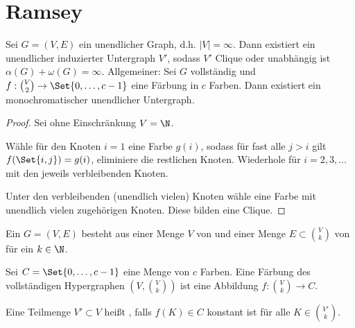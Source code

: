 \chapter{Ramsey}



\begin{st}
    Sei $G = (V,E)$ ein unendlicher Graph, d.h. $|V| = \infty$.
    Dann existiert ein unendlicher induzierter Untergraph $V'$, sodass $V'$ Clique oder unabhängig ist
    \begin{math}
        \alpha(G) + \omega(G) = \infty.
    \end{math}
    Allgemeiner:
    Sei $G$ vollständig und $f: \binom{V}{2} \to \Set{0, \dotsc, c - 1}$ eine Färbung in $c$ Farben.
    Dann existiert ein monochromatischer unendlicher Untergraph.
    \begin{proof}
        Sei ohne Einschränkung $V = \N$.

        Wähle für den Knoten $i = 1$ eine Farbe $g(i)$, sodass für fast alle $j > i$ gilt $f(\Set{i,j}) = g(i)$, eliminiere die restlichen Knoten.
        Wiederhole für $i = 2, 3, \dotsc$ mit den jeweils verbleibenden Knoten.

        Unter den verbleibenden (unendlich vielen) Knoten wähle eine Farbe mit unendlich vielen zugehörigen Knoten.
        Diese bilden eine Clique.
    \end{proof}
\end{st}

\begin{df}
    Ein  $G = (V, E)$ besteht aus einer Menge $V$ von  und einer Menge $E \subset \binom{V}{k}$ von  für ein $k \in \N$.

    Sei $C = \Set{0, \dotsc, c-1}$ eine Menge von $c$ Farben.
    Eine Färbung des vollständigen Hypergraphen $(V, \binom{V}{k})$ ist eine Abbildung $f: \binom{V}{k} \to C$.

    Eine Teilmenge $V' \subset V$ heißt , falls $f(K) \in C$ konstant ist für alle $K \in \binom{V'}{k}$.
\end{df}

